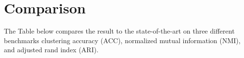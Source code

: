 \newpage
\section{Comparison}
\label{sec:verify}


The Table below compares the result to the state-of-the-art on three different benchmarks clustering accuracy (ACC), normalized mutual information (NMI), and adjusted rand index (ARI). 


%
%
%

\setlength{\tabcolsep}{4pt}
